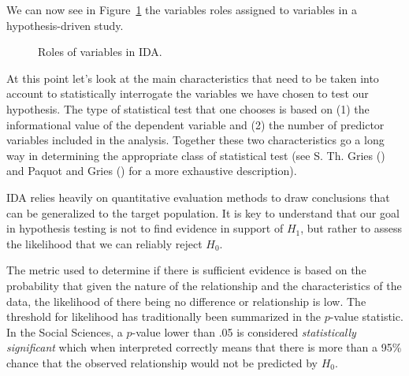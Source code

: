 \documentclass[
  letterpaper,
]{latex/krantz}
\theoremstyle{definition}
\theoremstyle{remark}
\begin{document}
We can now see in Figure~\ref{fig-aa-ida-variables} the variables roles
assigned to variables in a hypothesis-driven study.

\begin{figure}[H]


\caption{\label{fig-aa-ida-variables}Roles of variables in IDA.}

\end{figure}%

At this point let's look at the main characteristics that need to be
taken into account to statistically interrogate the variables we have
chosen to test our hypothesis. The type of statistical test that one
chooses is based on (1) the informational value of the dependent
variable and (2) the number of predictor variables included in the
analysis. Together these two characteristics go a long way in
determining the appropriate class of statistical test (see S. Th. Gries
() and Paquot and Gries
() for a more exhaustive description).

IDA relies heavily on quantitative evaluation methods to draw
conclusions that can be generalized to the target population. It is key
to understand that our goal in hypothesis testing is not to find
evidence in support of \(H_1\), but rather to assess the likelihood that
we can reliably reject \(H_0\).

The metric used to determine if there is sufficient evidence is based on
the probability that given the nature of the relationship and the
characteristics of the data, the likelihood of there being no difference
or relationship is low. The threshold for likelihood has traditionally
been summarized in the \(p\)-value statistic. In the Social Sciences, a
\(p\)-value lower than .05 is considered \emph{statistically
significant} which when interpreted correctly means that there is more
than a 95\% chance that the observed relationship would not be predicted
by \(H_0\).
\end{document}
